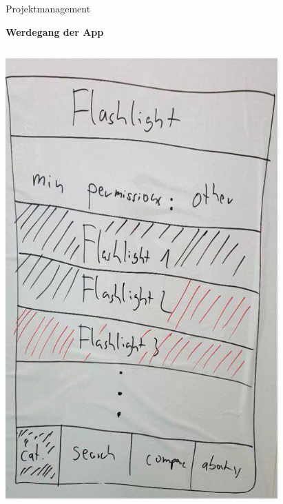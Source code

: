 \documentclass[compress,t]{beamer}
\begin{document}
\begin{frame}{Projektmanagement}

    \textbf{Werdegang der App}

    \begin{columns}[t]
        \centering
        \includegraphics[width=0.8\textwidth]{img/1.jpg}\\
        \centering

\end{columns}
\end{frame}
\end{document}
